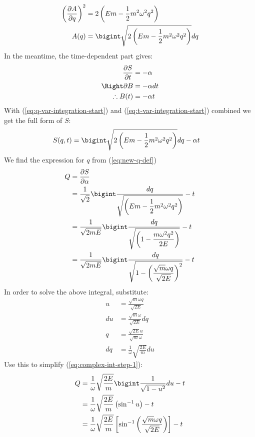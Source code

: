 \begin{enumerate}
\begin{align}
    \left(\frac{\partial A}{\partial q}\right)^2&=2\left(Em-\frac{1}{2}m^2\omega^2q^2\right)\notag\\
    A(q)&=\bigint\sqrt{2\left(Em-\frac{1}{2}m^2\omega^2q^2\right)}dq\label{eq:q-var-integration-start}
\end{align}
In the meantime, the time-dependent part gives:
\begin{align}
    \frac{\partial S}{\partial t}&=-\alpha\notag\\
    \Right \partial B&=-\alpha dt\notag\\
    \therefore B(t)&=-\alpha t\label{eq:t-var-integration-start}
\end{align}
With (\ref{eq:q-var-integration-start}) and (\ref{eq:t-var-integration-start}) combined we get the full form of $S$:
\begin{align}
    S(q,t)&=\bigint\sqrt{2\left(Em-\frac{1}{2}m^2\omega^2q^2\right)}dq-\alpha t
\end{align}
We find the expression for $q$ from (\ref{eq:new-q-def})
\begin{align}
    Q&=\frac{\partial S}{\partial \alpha}\notag\\
    &=\frac{1}{\sqrt{2}}\bigint\frac{dq}{\displaystyle\sqrt{\left(Em-\frac{1}{2}m^2\omega^2q^2\right)}}-t\notag\\
    &=\frac{1}{\sqrt{2mE}}\bigint\frac{dq}{\displaystyle\sqrt{\left(1-\frac{m\omega^2q^2}{2E}\right)}}-t\notag\\
    &=\frac{1}{\sqrt{2mE}}\bigint\frac{dq}{\displaystyle\sqrt{1-\left(\frac{\sqrt{m}\omega q}{\sqrt{2E}}\right)^2}}-t\label{eq:complex-int-step-1}
\end{align}
In order to solve the above integral, substitute:
\begin{align}
    u&=\frac{\sqrt{m}\omega q}{\sqrt{2E}}\\
    du&=\frac{\sqrt{m}\omega}{\sqrt{2E}}dq\\
    q&=\frac{\sqrt{2E}u}{\sqrt{m}\omega}\\
    dq&=\frac{1}{\omega}\sqrt{\frac{2E}{m}}du
\end{align}
Use this to simplify (\ref{eq:complex-int-step-1}):
\begin{align}
    Q&=\frac{1}{\omega}\sqrt{\frac{2E}{m}}\bigint\frac{1}{\sqrt{1-u^2}}du-t\notag\\
    &=\frac{1}{\omega}\sqrt{\frac{2E}{m}}\left(\sin^{-1}{u}\right)-t\notag\\
    &=\frac{1}{\omega}\sqrt{\frac{2E}{m}}\left[\sin^{-1}\left({\frac{\sqrt{m}\omega q}{\sqrt{2E}}}\right)\right]-t\notag\\

\end{align}
\end{enumerate}
